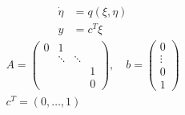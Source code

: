 \documentclass[ngerman]{tudscrreprt}
\begin{document}
\begin{itemize}
\begin{align*}
\dot \eta &= q(\xi, \eta)\\
y&= c^T \xi \tag{5.11}
\end{align*}
\begin{align*}
A= \begin{pmatrix} 0&1 &&\\ & \ddots&\ddots&\\ &&&1\\ &&&0\end{pmatrix}, \quad b = \begin{pmatrix} 0\\ \vdots\\  0\\ 1\end{pmatrix}\\ 
c^T = (0,\dots, 1)
\end{align*}
\end{itemize} 
\end{document}
